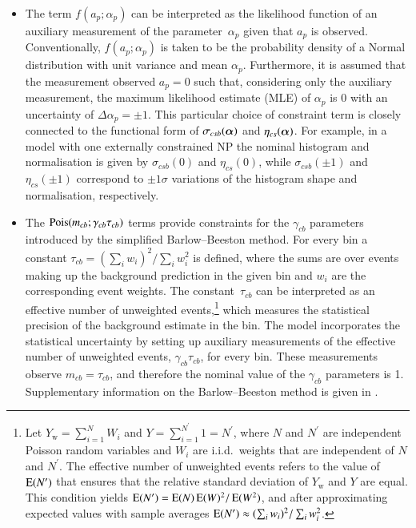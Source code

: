 \begin{itemize}

\item The term $f(a_p; \alpha_p)$ can be interpreted as the likelihood function
  of an auxiliary measurement of the parameter~$\alpha_p$ given that $a_p$ is
  observed. Conventionally, $f(a_p; \alpha_p)$ is taken to be the probability
  density of a Normal distribution with unit variance and mean
  $\alpha_p$. Furthermore, it is assumed that the measurement observed $a_p = 0$
  such that, considering only the auxiliary measurement, the maximum likelihood
  estimate (MLE) of $\alpha_p$ is 0 with an uncertainty of
  $\Delta \alpha_p = \pm 1$. This particular choice of constraint term is
  closely connected to the functional form of $\sigma_{csb}(\bm{\alpha})$ and
  $\eta_{cs}(\bm{\alpha})$. For example, in a model with one externally
  constrained NP the nominal histogram and normalisation is given by
  $\sigma_{csb}(0)$ and $\eta_{cs}(0)$, while $\sigma_{csb}(\pm 1)$ and
  $\eta_{cs}(\pm 1)$ correspond to $\pm 1 \sigma$ variations of the histogram
  shape and normalisation, respectively.


\item The $\operatorname{Pois}(m_{cb}; \gamma_{cb} \tau_{cb})$ terms provide constraints for
  the $\gamma_{cb}$ parameters introduced by the simplified Barlow--Beeston
  method. For every bin a constant
  $ \tau_{cb} = ( \sum_i w_i )^2 / \sum_i w_i^2 $ is defined, where the sums are
  over events making up the background prediction in the given bin and $w_i$ are
  the corresponding event weights. The constant~$\tau_{cb}$ can be interpreted
  as an effective number of unweighted events,\footnote{Let
    $Y_{\text{w}} = \sum_{i = 1}^{N} W_i$ and
    $Y = \sum_{i = 1}^{N^\prime} 1 = N^\prime$, where $N$ and $N^\prime$ are
    independent Poisson random variables and $W_i$ are i.i.d.\ weights that are
    independent of $N$ and $N^\prime$. The effective number of unweighted events
    refers to the value of $\operatorname{E}(N^\prime)$ that ensures that the relative
    standard deviation of $Y_{\text{w}}$ and $Y$ are equal. This condition
    yields $\operatorname{E}(N^\prime) = \operatorname{E}(N) \operatorname{E}(W)^2 / \operatorname{E}(W^2)$, and
    after approximating expected values with sample averages
    $\operatorname{E}(N^\prime) \approx ( \sum_i w_i )^2 / \sum_i w_i^2$.} which measures
  the statistical precision of the background estimate in the bin. The model
  incorporates the statistical uncertainty by setting up auxiliary measurements
  of the effective number of unweighted events, $\gamma_{cb}\tau_{cb}$, for
  every bin. These measurements observe $m_{cb} = \tau_{cb}$, and therefore the
  nominal value of the $\gamma_{cb}$ parameters is 1. Supplementary information
  on the Barlow--Beeston method is given in .

\end{itemize}

